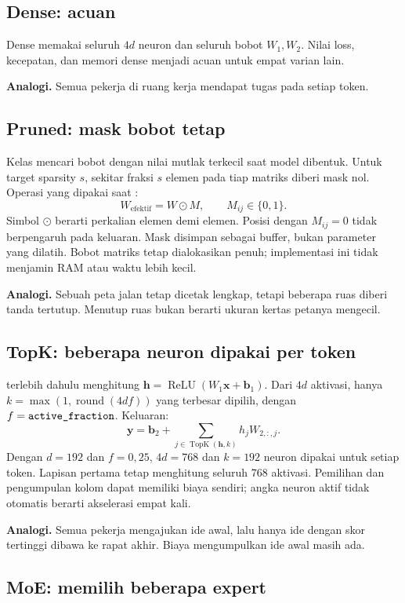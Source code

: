 \documentclass[11pt,a4paper]{article}
\DeclareRobustCommand{\code}[1]{\texttt{\detokenize{#1}}}
\newcommand{\analogi}[1]{\par\smallskip\noindent\textbf{Analogi.} #1\par\smallskip}
\begin{document}
\subsection{Dense: acuan}

Dense memakai seluruh $4d$ neuron dan seluruh bobot $W_1,W_2$. Nilai loss,
kecepatan, dan memori dense menjadi acuan untuk empat varian lain.
\analogi{Semua pekerja di ruang kerja mendapat tugas pada setiap token.}

\subsection{Pruned: mask bobot tetap}

Kelas \code{PrunedMLP} mencari bobot dengan nilai mutlak terkecil saat
model dibentuk. Untuk target sparsity $s$, sekitar fraksi $s$ elemen pada
tiap matriks diberi mask nol. Operasi yang dipakai saat \code{forward}:
\[
W_{\mathrm{efektif}}=W\odot M,\qquad
M_{ij}\in\{0,1\}.
\]
Simbol $\odot$ berarti perkalian elemen demi elemen. Posisi dengan $M_{ij}=0$
tidak berpengaruh pada keluaran. Mask disimpan sebagai buffer, bukan parameter
yang dilatih. Bobot matriks tetap dialokasikan penuh; implementasi ini tidak
menjamin RAM atau waktu lebih kecil.

\analogi{Sebuah peta jalan tetap dicetak lengkap, tetapi beberapa ruas diberi
tanda tertutup. Menutup ruas bukan berarti ukuran kertas petanya mengecil.}

\subsection{TopK: beberapa neuron dipakai per token}

\code{TopKMLP} terlebih dahulu menghitung
$\mathbf{h}=\operatorname{ReLU}(W_1\mathbf{x}+\mathbf b_1)$.
Dari $4d$ aktivasi, hanya $k=\max(1,\operatorname{round}(4df))$ yang
terbesar dipilih, dengan $f=\code{active_fraction}$. Keluaran:
\[
\mathbf y=\mathbf b_2+\sum_{j\in\operatorname{TopK}(\mathbf h,k)}
h_j W_{2,:,j}.
\]
Dengan $d=192$ dan $f=0{,}25$, $4d=768$ dan $k=192$ neuron dipakai
untuk setiap token. Lapisan pertama tetap menghitung seluruh 768 aktivasi.
Pemilihan \code{topk} dan pengumpulan kolom dapat memiliki biaya sendiri;
angka neuron aktif tidak otomatis berarti akselerasi empat kali.

\analogi{Semua pekerja mengajukan ide awal, lalu hanya ide dengan skor
tertinggi dibawa ke rapat akhir. Biaya mengumpulkan ide awal masih ada.}

\subsection{MoE: memilih beberapa expert}
\end{document}
